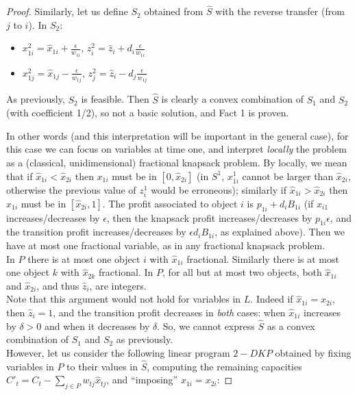 \documentclass[a4paper]{book}
\newtheorem{proof}{\noindent{\bf Proof.} }
\begin{document}
\begin{proof}
Similarly, let us define $S_2$ obtained from $\hat{S}$ with the reverse transfer (from $j$ to $i$). In $S_2$:
\begin{itemize}
	\item $x^2_{1i}=\hat{x}_{1i}+\frac{\epsilon}{w_{1i}}$, $z^2_i=\hat{z}_i+d_i\frac{\epsilon}{w_{1i}}$
	\item $x^2_{1j}=\hat{x}_{1j}-\frac{\epsilon}{w_{1j}}$, $z^2_j=\hat{z}_i-d_j\frac{\epsilon}{w_{1j}}$
\end{itemize}
As previously, $S_2$ is feasible. Then $\hat{S}$ is clearly a convex combination of $S_1$ and $S_2$ (with coefficient 1/2), so not a basic solution, and Fact 1 is proven. 

In other words (and this interpretation will be important in the general case), for this case we can focus on variables at time one, and interpret \emph{locally} the problem as a (classical, unidimensional) fractional knapsack problem. By locally, we mean that if $\hat{x}_{1i}<\hat{x}_{2i}$ then $x_{1i}$ must be in $[0,\hat{x}_{2i}]$ (in $S^1$, $x^1_{1i}$ cannot be larger than $\hat{x}_{2i}$, otherwise the previous value of $z^1_{i}$  would be erroneous); similarly if $\hat{x}_{1i}>\hat{x}_{2i}$ then $x_{1i}$ must be in $[\hat{x}_{2i},1]$. The profit associated to object $i$ is $p_{1i}+d_iB_{1i}$ (if $x_{i1}$ increases/decreases by $\epsilon$, then the knapsack profit increases/decreases by $p_{1i}\epsilon$, and the transition profit increases/decreases by $\epsilon d_i B_{1i}$, as explained above). Then we have at most one fractional variable, as in any fractional knapsack problem.\\

In $P$ there is at most one object $i$ with $\hat{x}_{1i}$ fractional. Similarly there is at most one object $k$ with $\hat{x}_{2k}$ fractional. In $P$, for all but at most two objects, both $\hat{x}_{1i}$ and $\hat{x}_{2i}$, and thus $\hat{z}_i$, are integers.\\


Note that this argument would not hold for variables in $L$. Indeed if $\hat{x}_{1i}=\hat{x}_{2i}$, then $\hat{z}_i=1$, and the transition profit decreases in {\it both} cases: when $\hat{x}_{1i}$ increases by $\delta>0$ and when it decreases by $\delta$. So, we cannot express $\hat{S}$ as a convex combination of $S_1$ and $S_2$ as previously. \\  


However, let us consider the following linear program $2-DKP$ obtained by fixing variables in $P$ to their values in $\hat{S}$, computing the remaining capacities $C'_t=C_t-\sum_{j\in P}w_{tj}\hat{x}_{tj}$, and ``imposing'' $x_{1i}=x_{2i}$: 


\end{proof}
\end{document}
